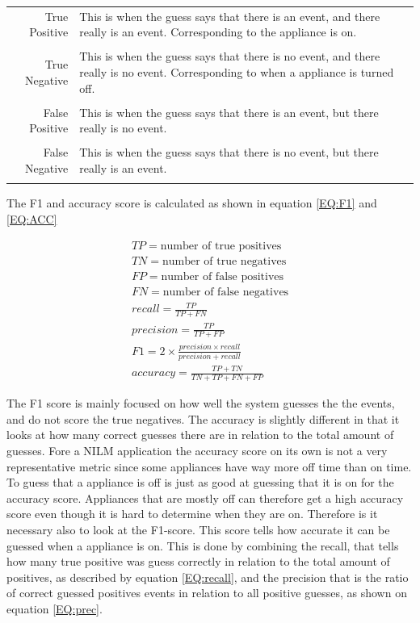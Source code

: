 \begin{tabularx}{\linewidth}{ r X }
True Positive& This is when the guess says that there is an event, and there really is an event. Corresponding to the appliance is on. \\
\\
True Negative&This is when the guess says that there is no event, and there really is no event. Corresponding to when a appliance is turned off. \\
\\
False Positive& This is when the guess says that there is an event, but there really is no event. \\
\\
False Negative&This is when the guess says that there is no event, but there really is an event. \\\\
\end{tabularx}
The F1 and accuracy score is calculated as shown in equation \ref{EQ:F1} and \ref{EQ:ACC}

\begin{gather}
		TP = \text{number of true positives} \\
		TN = \text{number of true negatives} \\
		FP = \text{number of false positives} \\
		FN = \text{number of false negatives} \\
		recall = \frac{TP}{TP+FN} \label{EQ:recall}\\
		precision = \frac{TP}{TP+FP} \label{EQ:prec} \\
		F1 = 2 \times \frac{precision \times recall}{precision + recall} \label{EQ:F1}\\
		accuracy = \frac{TP+TN}{TN+TP+FN+FP} \label{EQ:ACC}
\end{gather}

The F1 score is mainly focused on how well the system guesses the the events, and do not score the true negatives. The accuracy is slightly different in that it looks at how many correct guesses there are in relation to the total amount of guesses. Fore a NILM application the accuracy score on its own is not a very representative metric since some appliances have way more off time than on time. To guess that a appliance is off is just as good at guessing that it is on for the accuracy score. Appliances that are mostly off can therefore get a high accuracy score even though it is hard to determine when they are on. Therefore is it necessary also to look at the F1-score. This score tells how accurate it can be guessed when a appliance is on. This is done by combining the recall, that tells how many true positive was guess correctly in relation to the total amount of positives, as described by equation \ref{EQ:recall}, and the precision that is the ratio of correct guessed positives events in relation to all positive guesses, as shown on equation \ref{EQ:prec}. 

